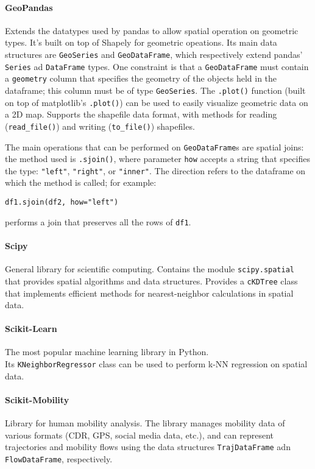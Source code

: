 \paragraph{GeoPandas}
Extends the datatypes used by pandas to allow spatial operation on geometric types. It's built on top of Shapely for geometric opeations. Its main data structures are \texttt{GeoSeries} and \texttt{GeoDataFrame}, which respectively extend pandas' \texttt{Series} ad \texttt{DataFrame} types. One constraint is that a \texttt{GeoDataFrame} must contain a \texttt{geometry} column that specifies the geometry of the objects held in the dataframe; this column must be of type \texttt{GeoSeries}. The \texttt{.plot()} function (built on top of matplotlib's \texttt{.plot()}) can be used to easily visualize geometric data on a 2D map. Supports the shapefile data format, with methods for reading (\texttt{read\_file()}) and writing (\texttt{to\_file()}) shapefiles.

The main operations that can be performed on \texttt{GeoDataFrame}s are spatial joins: the method used is \texttt{.sjoin()}, where parameter \texttt{how} accepts a string that specifies the type: \texttt{"left"}, \texttt{"right"}, or \texttt{"inner"}. The direction refers to the dataframe on which the method is called; for example:
\begin{center}
    \texttt{df1.sjoin(df2, how="left")}
\end{center}
performs a join that preserves all the rows of \texttt{df1}.

\paragraph{Scipy}
General library for scientific computing. Contains the module \texttt{scipy.spatial} that provides spatial algorithms and data structures. Provides a \texttt{cKDTree} class that implements efficient methods for nearest-neighbor calculations in spatial data.

\paragraph{Scikit-Learn}
The most popular machine learning library in Python. \\
Its \texttt{KNeighborRegressor} class can be used to perform k-NN regression on spatial data.

\paragraph{Scikit-Mobility}
Library for human mobility analysis. The library manages mobility data of various formats (CDR, GPS, social media data, etc.), and can represent trajectories and mobility flows using the data structures \texttt{TrajDataFrame} adn \texttt{FlowDataFrame}, respectively.

